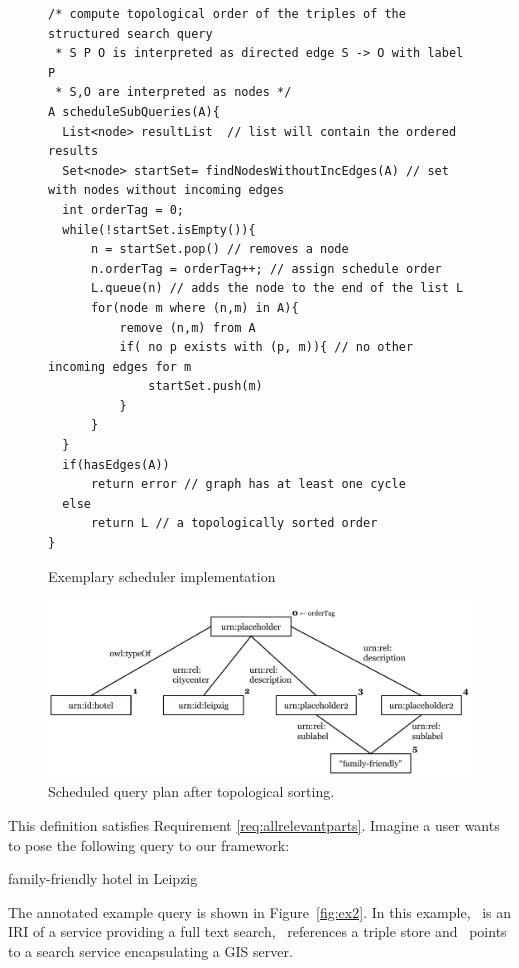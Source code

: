 \begin{figure}[p!]
\lstset{language=Java}
\begin{lstlisting}[frame=single]
/* compute topological order of the triples of the structured search query 
 * S P O is interpreted as directed edge S -> O with label P 
 * S,O are interpreted as nodes */
A scheduleSubQueries(A){
  List<node> resultList  // list will contain the ordered results
  Set<node> startSet= findNodesWithoutIncEdges(A) // set with nodes without incoming edges
  int orderTag = 0;
  while(!startSet.isEmpty()){
      n = startSet.pop() // removes a node 
      n.orderTag = orderTag++; // assign schedule order
      L.queue(n) // adds the node to the end of the list L
      for(node m where (n,m) in A){
          remove (n,m) from A
          if( no p exists with (p, m)){ // no other incoming edges for m
              startSet.push(m) 
          }
      }
  }
  if(hasEdges(A))
      return error // graph has at least one cycle
  else 
      return L // a topologically sorted order
}
\end{lstlisting}
\caption{Exemplary scheduler implementation}
\label{fig:scheduler}
\end{figure}

\begin{figure}[p!tb]
\centering
\includegraphics[width=\textwidth]{part_03/SEMANTiCS_architecture/query_plan_tree.pdf}
\caption{Scheduled query plan after topological sorting.}
\label{queryplantree}
\end{figure}



This definition satisfies Requirement \ref{req:allrelevantparts}.
Imagine a user wants to pose the following query to our framework: 
\begin{ex}
family-friendly hotel in Leipzig
\end{ex}

The annotated example query is shown in Figure~\ref{fig:ex2}.
In this example, \ssfulltext\ is an IRI of a service providing a full text search, \sstriplestore\ references a triple store and \ssgeo\ points to a search service encapsulating a GIS server.


